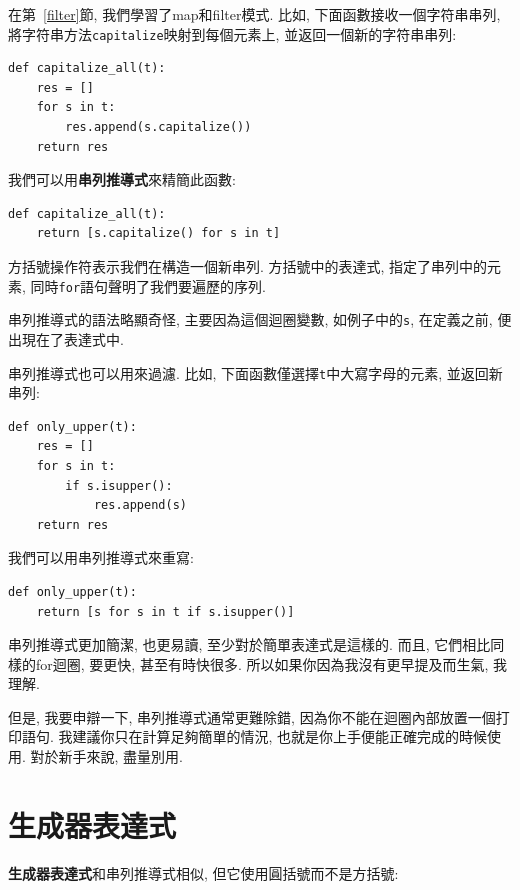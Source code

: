 \documentclass[10pt]{book}
\begin{document}
在第~\ref{filter}節, 我們學習了map和filter模式. 
比如, 下面函數接收一個字符串串列, 將字符串方法{\tt capitalize}映射到每個元素上, 
並返回一個新的字符串串列:

\begin{verbatim}
def capitalize_all(t):
    res = []
    for s in t:
        res.append(s.capitalize())
    return res
\end{verbatim}

我們可以用{\bf 串列推導式}來精簡此函數:

\begin{verbatim}
def capitalize_all(t):
    return [s.capitalize() for s in t]
\end{verbatim}

方括號操作符表示我們在構造一個新串列. 
方括號中的表達式, 指定了串列中的元素, 同時{\tt for}語句聲明了我們要遍歷的序列. 

串列推導式的語法略顯奇怪, 主要因為這個迴圈變數, 如例子中的{\tt s}, 在定義之前, 
便出現在了表達式中. 

串列推導式也可以用來過濾. 
比如, 下面函數僅選擇{\tt t}中大寫字母的元素, 並返回新串列:

\begin{verbatim}
def only_upper(t):
    res = []
    for s in t:
        if s.isupper():
            res.append(s)
    return res
\end{verbatim}

我們可以用串列推導式來重寫:

\begin{verbatim}
def only_upper(t):
    return [s for s in t if s.isupper()]
\end{verbatim}

串列推導式更加簡潔, 也更易讀, 至少對於簡單表達式是這樣的. 
而且, 它們相比同樣的for迴圈, 要更快, 甚至有時快很多. 
所以如果你因為我沒有更早提及而生氣, 我理解. 

但是, 我要申辯一下, 串列推導式通常更難除錯, 
因為你不能在迴圈內部放置一個打印語句. 
我建議你只在計算足夠簡單的情況, 也就是你上手便能正確完成的時候使用. 
對於新手來說, 盡量別用. 



\section{生成器表達式}

{\bf 生成器表達式}和串列推導式相似, 但它使用圓括號而不是方括號:
\end{document}
